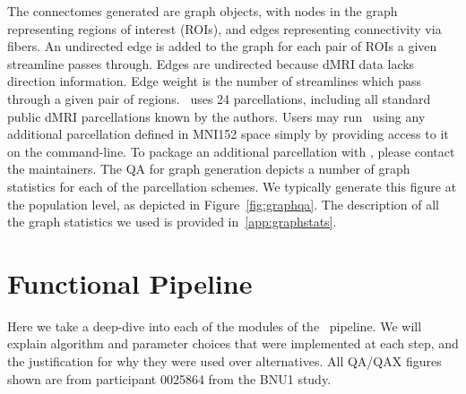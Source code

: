 \documentclass[11pt]{article}
\begin{document}
 The connectomes generated are graph objects, with nodes in the graph representing regions of interest
(ROIs), and edges representing connectivity via fibers. 
An undirected edge is added to the graph for each pair of ROIs a given streamline passes through.
Edges are undirected because dMRI data lacks direction information.
Edge weight is the number of streamlines which pass through a given pair of regions.
%
\ndmg~uses 24 parcellations, including all standard public dMRI parcellations known by the authors.
Users may run \ndmg~using any additional parcellation defined in MNI152 space simply by providing access to it on the command-line. To package an additional parcellation with \ndmg, please contact the maintainers.
The QA for graph generation depicts a number of graph statistics for each of the parcellation schemes.  We typically generate this figure at the population level, as depicted in Figure~\ref{fig:graphqa}. The description of all the graph statistics we used is provided in~\ref{app:graphstats}. 


\section{Functional  Pipeline} \label{app:fpipe}
Here we take a deep-dive into each of the modules of the \ndmgf~pipeline. We will explain algorithm and parameter
choices that were implemented at each step, and the justification for why they were used over alternatives. All QA/QAX figures shown are from participant 0025864 from the BNU1 \cite{corr} study.
\end{document}
